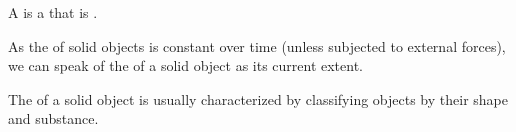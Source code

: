 \begin{module}[id=solidobj]
\begin{definition}
  A  is a  that is
  . 

  As the  of solid objects is constant over time (unless subjected
  to external forces), we can speak of the  of a solid object as its current
  extent.
\end{definition}

\begin{definition}
  The  of a solid object is usually characterized by classifying objects by
  their shape and substance.
\end{definition}
\end{module}
